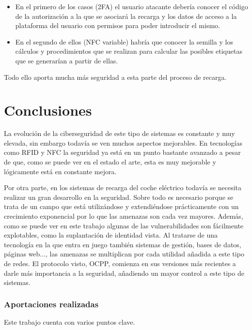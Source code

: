 \documentclass[12pt,a4paper,onecolumn,oneside]{report}
\newcommand{\mychapter}[2]{
	\setcounter{chapter}{#1}
	\setcounter{section}{1}
	\chapter*{#2}
	\addcontentsline{toc}{chapter}{#2}
}
\begin{document}
\begin{itemize}
\item En el primero de los casos (2FA) el usuario atacante debería conocer el código de la autorización a la que se asociará la recarga y los datos de acceso a la plataforma del usuario con permisos para poder introducir el mismo.
\item En el segundo de ellos (NFC variable) habría que conocer la semilla y los cálculos y procedimientos que se realizan para calcular las posibles etiquetas que se generarían a partir de ellas.
\end{itemize}

Todo ello aporta mucha más seguridad a esta parte del proceso de recarga.

\mychapter{1}{Conclusiones}

La evolución de la ciberseguridad de este tipo de sistemas es constante y muy elevada, sin embargo todavía se ven muchos aspectos mejorables.
En tecnologías como RFID y NFC la seguridad ya está en un punto bastante avanzado a pesar de que, como se puede ver en el estado el arte, esta es muy mejorable y lógicamente está en constante mejora.

Por otra parte, en los sistemas de recarga del coche eléctrico todavía se necesita realizar un gran desarrollo en la seguridad. Sobre todo es necesario porque se trata de un campo que está utilizándose y extendiéndose prácticamente con un crecimiento exponencial por lo que las amenazas son cada vez mayores. Además, como se puede ver en este trabajo algunas de las vulnerabilidades son fácilmente explotables, como la suplantación de identidad vista. Al tratarse de una tecnología en la que entra en juego también sistemas de gestión, bases de datos, páginas web..., las amenazas se multiplican por cada utilidad añadida a este tipo de redes. El protocolo visto, OCPP, comienza en sus versiones más recientes a darle más importancia a la seguridad, añadiendo un mayor control a este tipo de sistemas.


\subsection*{Aportaciones realizadas}

Este trabajo cuenta con varios puntos clave. 
\end{document}
